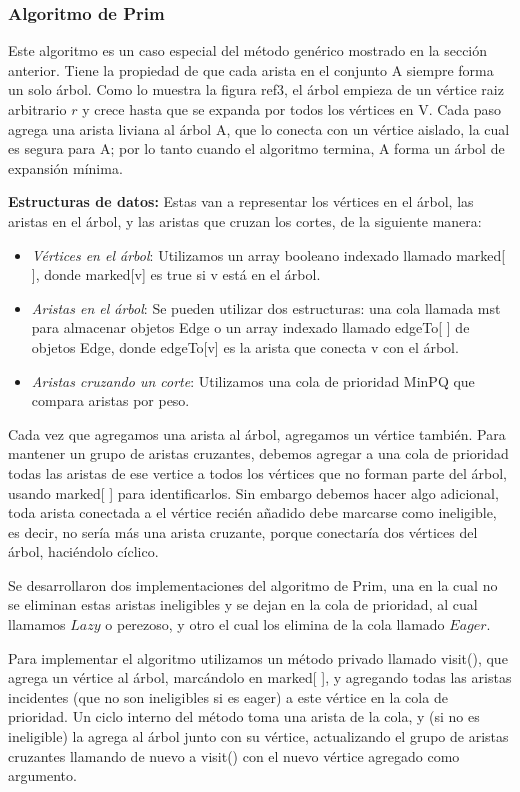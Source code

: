 \documentclass[a4paper, 11pt]{report}
\begin{document}
\subsubsection{Algoritmo de Prim}

Este algoritmo es un caso especial del método genérico mostrado en la sección anterior. Tiene la propiedad de que cada arista en el conjunto A siempre forma un solo árbol. Como lo muestra la figura ref3, el árbol empieza de un vértice raiz arbitrario $r$ y crece hasta que se expanda por todos los vértices en V. Cada paso agrega una arista liviana al árbol A, que lo conecta con un vértice aislado, la cual es segura para A; por lo tanto cuando el algoritmo termina, A forma un árbol de expansión mínima. 

\textbf{Estructuras de datos:} Estas van a representar los vértices en el árbol, las aristas en el árbol, y las aristas que cruzan los cortes, de la siguiente manera:
\begin{itemize}
\item \textit{Vértices en el árbol}: Utilizamos un array booleano indexado llamado marked[ ], donde marked[v] es true si v está en el árbol.
\item \textit{Aristas en el árbol}: Se pueden utilizar dos estructuras: una cola llamada mst para almacenar objetos Edge o un array indexado llamado edgeTo[ ] de objetos Edge, donde edgeTo[v] es la arista que conecta v con el árbol.
\item \textit{Aristas cruzando un corte}: Utilizamos una cola de prioridad MinPQ que compara aristas por peso.  
\end{itemize}

Cada vez que agregamos una arista al árbol, agregamos un vértice también. Para mantener un grupo de aristas cruzantes, debemos agregar a una cola de prioridad todas las aristas de ese vertice a todos los vértices que no forman parte del árbol, usando marked[ ] para identificarlos. Sin embargo debemos hacer algo adicional, toda arista conectada a el vértice recién añadido debe marcarse como ineligible, es decir, no sería más una arista cruzante, porque conectaría dos vértices del árbol, haciéndolo cíclico.

Se desarrollaron dos implementaciones del algoritmo de Prim, una en la cual no se eliminan estas aristas ineligibles y se dejan en la cola de prioridad, al cual llamamos $Lazy$ o perezoso, y otro el cual los elimina de la cola llamado $Eager$. 

Para implementar el algoritmo utilizamos un método privado llamado visit(), que agrega un vértice al árbol, marcándolo en marked[ ], y agregando todas las aristas incidentes (que no son ineligibles si es eager) a este vértice en la cola de prioridad. Un ciclo interno del método toma una arista de la cola, y (si no es ineligible) la agrega al árbol junto con su vértice, actualizando el grupo de aristas cruzantes llamando de nuevo a visit() con el nuevo vértice agregado como argumento. 
\end{document}
